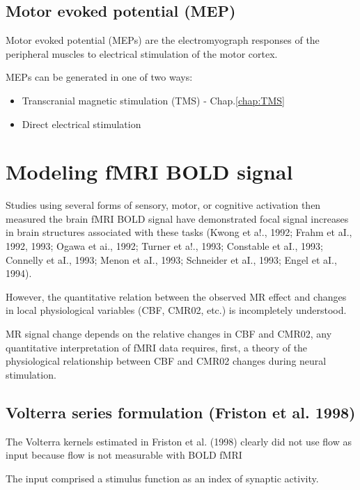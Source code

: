 \section{Motor evoked potential (MEP)}
\label{sec:motor-evoked-potential}

Motor evoked potential (MEPs) are the electromyograph responses of the
peripheral muscles to electrical stimulation of the motor cortex.


MEPs can be generated in one of two ways:
\begin{itemize}
  \item Transcranial magnetic stimulation (TMS) - Chap.\ref{chap:TMS}

  \item	Direct electrical stimulation
\end{itemize}


\chapter{Modeling fMRI BOLD signal}

Studies using several forms of sensory, motor, or cognitive activation then
measured the brain fMRI BOLD signal have demonstrated focal signal increases in
brain structures associated with these tasks (Kwong et a!., 1992; Frahm et aI.,
1992, 1993; Ogawa et ai., 1992; Turner et a!., 1993; Constable et aI., 1993;
Connelly et aI., 1993; Menon et aI., 1993; Schneider et aI., 1993; Engel et aI.,
1994).

However, the quantitative relation
between the observed MR effect and changes in local physiological variables (CBF, CMR02, etc.) is incompletely
understood.

MR signal change depends on the relative changes in CBF and CMR02, any
quantitative interpretation of fMRI data requires, first, a theory of the
physiological relationship between CBF and CMR02 changes during neural
stimulation.



\section{Volterra series formulation (Friston et al. 1998)}

The Volterra kernels estimated in Friston
et al. (1998) clearly did not use flow as input because
flow is not measurable with BOLD fMRI

The input
comprised a stimulus function as an index of synaptic
activity.

